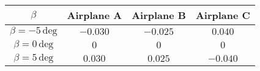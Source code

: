 \begin{tabular}[12pt]{ |c| c| c| c| }
\hline
$\beta$ & Airplane A & Airplane B & Airplane C \\
\hline
$\beta = -5\,\mathrm{deg}$ & $-0.030$ & $-0.025$ & $0.040$\\
\hline
$\beta = 0\,\mathrm{deg}$ & $0$ & $0$ & $0$ \\
\hline
$\beta = 5\,\mathrm{deg}$ & $0.030$ & $0.025$ & $-0.040$\\
\hline
\end{tabular}
